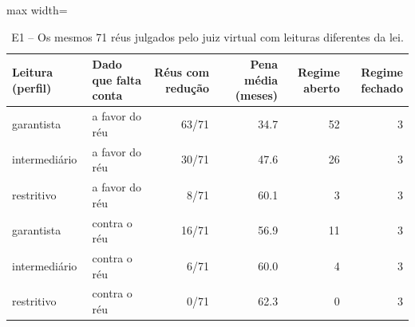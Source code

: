 \begin{table}[h]
\centering\small
\caption{E1 -- Os mesmos 71 réus julgados pelo juiz virtual com leituras diferentes da lei.}
\label{tab:e1}
\begin{adjustbox}{max width=\textwidth}
\begin{tabular}{llrrrr}
\toprule
Leitura (perfil) & Dado que falta conta & Réus com redução & Pena média (meses) & Regime aberto & Regime fechado \\
\midrule
garantista & a favor do réu & 63/71 & 34.7 & 52 & 3 \\
intermediário & a favor do réu & 30/71 & 47.6 & 26 & 3 \\
restritivo & a favor do réu & 8/71 & 60.1 & 3 & 3 \\
garantista & contra o réu & 16/71 & 56.9 & 11 & 3 \\
intermediário & contra o réu & 6/71 & 60.0 & 4 & 3 \\
restritivo & contra o réu & 0/71 & 62.3 & 0 & 3 \\
\bottomrule
\end{tabular}
\end{adjustbox}
\end{table}
